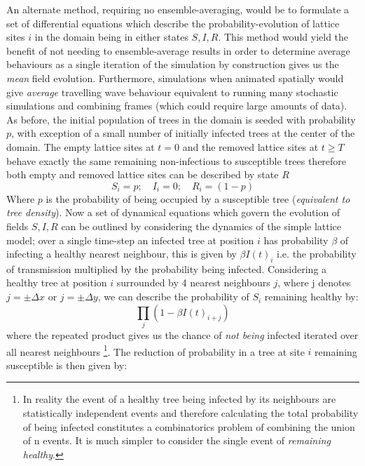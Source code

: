 An alternate method, requiring no ensemble-averaging, would be to formulate a set of differential equations which describe the probability-evolution of lattice sites $i$ in the domain being in either states $S,I,R$. This method would yield the benefit of not needing to ensemble-average results in order to determine average behaviours as a single iteration of the simulation by construction gives us the \textit{mean} field evolution. Furthermore, simulations when animated spatially would give \textit{average} travelling wave behaviour equivalent to running many stochastic simulations and combining frames (which could require large amounts of data). As before, the initial population of trees in the domain is seeded with probability $p$, with exception of a small number of initially infected trees at the center of the domain. The empty lattice sites at $t=0$ and the removed lattice sites at $t \ge T$ behave exactly the same remaining non-infectious to susceptible trees therefore both empty and removed lattice sites can be described by state $R$
\begin{equation}
       S_i = p;\quad I_i = 0;\quad R_i = (1 - p) 
\end{equation}{}
Where $p$ is the probability of being occupied by a susceptible tree (\textit{equivalent to tree density}). Now a set of dynamical equations which govern the evolution of fields $S,I,R$ can be outlined by considering the dynamics of the simple lattice model; over a single time-step an infected tree at position $i$ has probability $\beta$ of infecting a healthy nearest neighbour, this is given by $\beta I(t)_i$ i.e. the probability of transmission multiplied by the probability being infected. Considering a healthy tree at position $i$ surrounded by 4 nearest neighbours $j$, where j denotes $j= \pm \Delta x $ or $ j=\pm \Delta y$, we can describe the probability of $S_i$ remaining healthy by: 
\begin{equation}
    \prod_j (1 - \beta I(t)_{i+j})
    \label{eq:rep-prod-S}
\end{equation}{}
where the repeated product gives us the chance of \textit{not being} infected iterated over all nearest neighbours \footnote{In reality the event of a healthy tree being infected by its neighbours are statistically independent events and therefore calculating the total probability of being infected constitutes a combinatorics problem of combining the union of n events. It is much simpler to consider the single event of \textit{remaining healthy}.}. The reduction of probability in a tree at site $i$ remaining susceptible is then given by:
